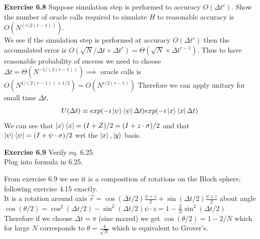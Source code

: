\documentclass{article}
\begin{document}
\begin{tcolorbox}\textbf{Exercise 6.8} Suppose simulation step is performed to accuracy $O(\Delta t^r)$. Show the number of oracle calls required to simulate $H$ to reasonable accuracy is $O(N^{(r/2(r-1))})$.\\
We see if the simulation step is performed at accuracy $O(\Delta t^r)$ then the accumulated error is $O(\sqrt{N}/\Delta t \times \Delta t^r) = \Theta (\sqrt{N} \times \Delta t^{r-1}).$ Thus to have reasonable probability of success we need to choose $\Delta t = \Theta(N^{-1/(2(r-1))}) \implies$ oracle calls is $O(N^{1/(2(r-1)) + 1/2}) = O(N^{r/2(r-1)})$
Therefore we can apply unitary for small time $\Delta t$,
$$U(\Delta t) \equiv exp(-i \ket{\psi}\bra{\psi} \Delta t) exp(-i \ket{x}\bra{x}\Delta t)$$
We can see that $\ket{x}\bra{x} = (I+Z)/2 = (I+ z \cdot \sigma)/2$ and that $\ket{\psi}\bra{\psi} = (I + \psi \cdot \sigma )/2$ wrt the $\ket{x},\ket{y}$ basis.
\end{tcolorbox}
\begin{tcolorbox}\textbf{Exercise 6.9} Verify eq. 6.25.\\
	Plug into formula in 6.25.
\end{tcolorbox}
From exercise 6.9 we see it is a composition of rotations on the Bloch sphere, following exercise 4.15 exactly.\\
It is a rotation around axis $\vec{r} = \cos (\Delta t/2) \frac{\psi + z}{2} + \sin (\Delta t/2) \frac{\psi \times z}{2}$
about angle $\cos (\theta/2) = \cos^2(\Delta t/2) - \sin^2 (\Delta t/2) \psi \cdot z = 1 - \frac{2}{N} \sin^2 (\Delta t/2)$
Therefore if we choose $\Delta t = \pi$ (sine maxed) we get $\cos(\theta/2) = 1 - 2/N$ which for large $N$ corresponds to $\theta = \frac{4}{\sqrt{N}}$ which is equivalent to Grover's.
\end{document}
